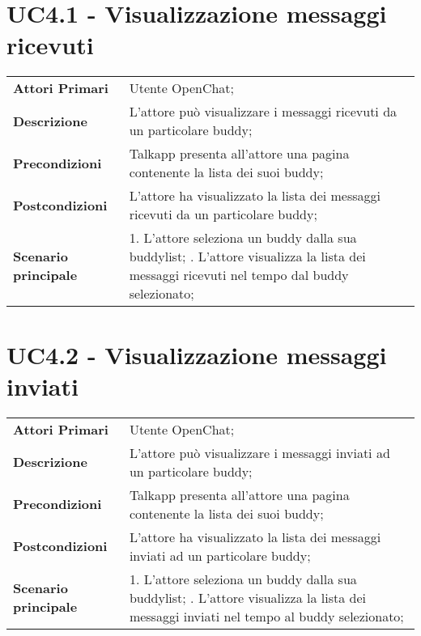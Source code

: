 \section{UC4.1 - Visualizzazione messaggi ricevuti}
\begin{center}
	\bgroup
	\def\arraystretch{1.8}     
	\begin{longtable}{  p{4cm} | p{9.5cm} } 
		\textbf{Attori Primari} & Utente OpenChat; \\ 
		\textbf{Descrizione} &  L'attore può visualizzare i messaggi ricevuti da un particolare buddy; \\ 
		\textbf{Precondizioni}  & Talkapp presenta all'attore una pagina contenente la lista dei suoi buddy; \\
		\textbf{Postcondizioni} & L'attore ha visualizzato la lista dei messaggi ricevuti  da un particolare buddy;  \\ 
		\textbf{Scenario principale} & 
		1. L'attore seleziona un buddy dalla sua buddylist; \newline
		2. L'attore visualizza la lista dei messaggi ricevuti nel tempo dal buddy selezionato;
	\end{longtable}
	\egroup
\end{center}

\section{UC4.2 - Visualizzazione messaggi inviati}
\begin{center}
	\bgroup
	\def\arraystretch{1.8}     
	\begin{longtable}{  p{4cm} | p{9.5cm} } 
		\textbf{Attori Primari} & Utente OpenChat; \\ 
		\textbf{Descrizione} &  L'attore può visualizzare i messaggi inviati ad un particolare buddy; \\ 
		\textbf{Precondizioni}  & Talkapp presenta all'attore una pagina contenente la lista dei suoi buddy; \\
		\textbf{Postcondizioni} & L'attore ha visualizzato la lista dei messaggi inviati  ad un particolare buddy;  \\ 
		\textbf{Scenario principale} & 
		1. L'attore seleziona un buddy dalla sua buddylist; \newline
		2. L'attore visualizza la lista dei messaggi inviati nel tempo al buddy selezionato;
	\end{longtable}
	\egroup
\end{center}

